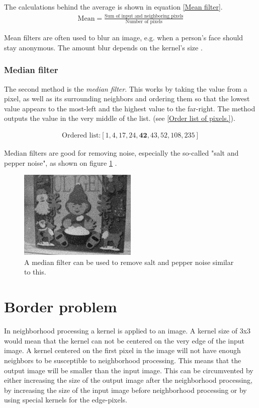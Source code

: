 The calculations behind the average is shown in equation \ref{Mean filter}.
\begin{equation}
	\begin{aligned}
	\text{Mean} = \frac{\text{Sum of input and neighboring pixels}}{\text{Number of pixels}}
	\label{Mean filter}
	\end{aligned}
\end{equation}

Mean filters are often used to blur an image, e.g. when a person's face should stay anonymous. The amount blur depends on the kernel's size \citep{ip_book}.

\subsubsection{Median filter}
The second method is the \textit{median filter}. This works by taking the value from a pixel, as well as its surrounding neighbors and ordering them so that the lowest value appears to the most-left and the highest value to the far-right. The method outputs the value in the very middle of the list. (see \ref{Order list of pixels.}).

\begin{equation}
\begin{aligned}{
\text{Ordered list:}[1,4,17,24,\boldsymbol{42},43,52,108,235]
	\label{Order list of pixels.}}	
	\end{aligned}
\end{equation}

Median filters are good for removing noise, especially the so-called "salt and pepper noise", as shown on figure \ref{fig:salt} \citep{ip_book}.
\begin{figure}[htbp]
\centering
\includegraphics[width=0.5\textwidth]{Pictures/Theory/saltNoise}
\caption{A median filter can be used to remove salt and pepper noise similar to this.}
\label{fig:salt}
\end{figure}

\section{Border problem}
In neighborhood processing a kernel is applied to an image. A kernel size of 3x3 would mean that the kernel can not be centered on the very edge of the input image. A kernel centered on the first pixel in the image will not have enough neighbors to be susceptible to neighborhood processing. This means that the output image will be smaller than the input image. This can be circumvented by either increasing the size of the output image after the neighborhood processing, by increasing the size of the input image before neighborhood processing or by using special kernels for the edge-pixels.

